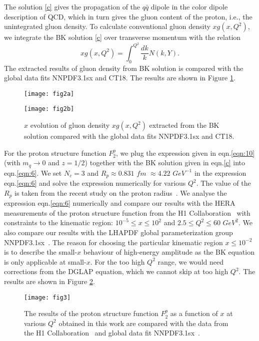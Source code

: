 \documentclass[12pt]{article}
\begin{document}
The solution \eqref{c} gives the propagation of the $q\bar{q}$ dipole in the color dipole description of QCD, which in turn gives the gluon content of the proton, i.e., the unintegrated gluon density. To calculate conventional gluon density $xg(x,Q^2)$, we integrate the BK solution \eqref{c} over transverse momentum with the relation
\begin{equation}\label{d}
	xg(x,Q^2) = \int_0 ^{Q^2} \frac{dk}{k}N(k,Y).
\end{equation}
The extracted results of gluon density from BK solution is compared with the global data fits NNPDF3.1sx and CT18. The results are shown in Figure \ref{fig.2}.
\begin{figure}[h]
	\centering
	\begin{minipage}{.5\textwidth}
		\centering
		\texttt{[image: fig2a]}
		\label{fig:test1}
	\end{minipage}%
	\begin{minipage}{.5\textwidth}
		\centering
		\texttt{[image: fig2b]}
		\label{fig:test2}
	\end{minipage}
	\caption{\label{fig.2}{$x$ evolution of gluon density $xg(x,Q^2)$ extracted from the BK solution compared with the global data fits NNPDF3.1sx and CT18. }}
\end{figure}

For the proton structure function $F_2 ^p$, we plug the expression given in eqn.\eqref{eqn:10} (with $m_q \to 0$ and $z=1/2$) together with the BK solution given in eqn.\eqref{c} into eqn.\eqref{eqn:6}. We set $N_c = 3$ and $R_p \approx 0.831$ $fm$ $\approx 4.22$ $GeV^{-1}$ in the expression eqn.\eqref{eqn:6} and solve the expression numerically for various $Q^2$. The value of the $R_p$ is taken from the recent study on the proton radius~\cite{am}. We analyse the expression eqn.\eqref{eqn:6} numerically and compare our results with the HERA measurements of the proton structure function from the H1 Collaboration~\cite{x} with constraints to the kinematic region: $10^{-5} \leq x \leq 10^{2}$ and $2.5 \leq Q^2 \leq 60$ $GeV^{2}$. We also compare our results with the LHAPDF global parameterization group NNPDF3.1sx~\cite{15}. The reason for choosing the particular kinematic region $x\leq 10^{-2}$ is to describe the small-$x$ behaviour of high-energy amplitude as the BK equation is only applicable at small-$x$. For the too high $Q^2$ range, we would need corrections from the DGLAP equation, which we cannot skip at too high $Q^2$. The results are shown in Figure \ref{fig:3}.
\begin{figure}[h]
	\centering
	\texttt{[image: fig3]}
	\caption{\label{fig:3}The results of the proton structure function $F_2 ^p$ as a function of $x$ at various $Q^2$ obtained in this work are compared with the data from the H1 Collaboration~\cite{x} and global data fit NNPDF3.1sx~\cite{15}.}
\end{figure}
\end{document}
